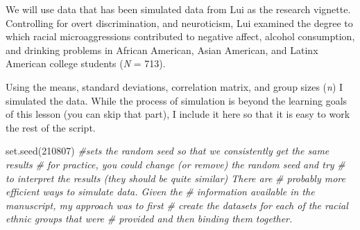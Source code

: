 \documentclass[
  11pt,
]{book}
\newenvironment{Shaded}{\begin{snugshade}}{\end{snugshade}}
\newcommand{\CommentTok}[1]{\textcolor[rgb]{0.56,0.35,0.01}{\textit{#1}}}
\newcommand{\DecValTok}[1]{\textcolor[rgb]{0.00,0.00,0.81}{#1}}
\newcommand{\FunctionTok}[1]{\textcolor[rgb]{0.00,0.00,0.00}{#1}}
\newcommand{\NormalTok}[1]{#1}
\begin{document}
We will use data that has been simulated data from Lui \citeyearpar{lui_racial_2020} as the research vignette. Controlling for overt discrimination, and neuroticism, Lui examined the degree to which racial microaggressions contributed to negative affect, alcohol consumption, and drinking problems in African American, Asian American, and Latinx American college students (\emph{N} = 713).

Using the means, standard deviations, correlation matrix, and group sizes (\emph{n}) I simulated the data. While the process of simulation is beyond the learning goals of this lesson (you can skip that part), I include it here so that it is easy to work the rest of the script.

\begin{Shaded}
\begin{Highlighting}[]
\FunctionTok{set.seed}\NormalTok{(}\DecValTok{210807}\NormalTok{)  }\CommentTok{\#sets the random seed so that we consistently get the same results}
\CommentTok{\# for practice, you could change (or remove) the random seed and try}
\CommentTok{\# to interpret the results (they should be quite similar) There are}
\CommentTok{\# probably more efficient ways to simulate data. Given the}
\CommentTok{\# information available in the manuscript, my approach was to first}
\CommentTok{\# create the datasets for each of the racial ethnic groups that were}
\CommentTok{\# provided and then binding them together.}


\end{Highlighting}
\end{Shaded}
\end{document}
